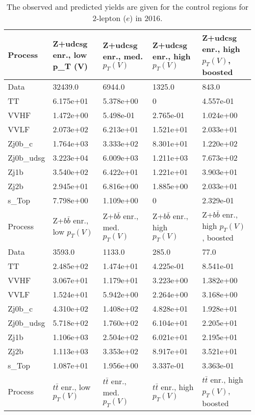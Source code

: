 \begin{table}
\centering
\caption[2016 2-lepton ($e$) control region yields]{
                  The observed and predicted yields are given for the
                  control regions for 2-lepton ($e$) in 2016.
                  }
{\footnotesize
\begin{tabularx}{\textwidth}{|X|X|X|X|X|}
\hline
Process & Z+udcsg enr., low p_{T} (V) & Z+udcsg enr., med. $p_{T}(V)$ & Z+udcsg enr., high $p_{T}(V)$ & Z+udcsg enr., high $p_{T}(V)$, boosted \\
\hline
Data & 32439.0 & 6944.0 & 1325.0 & 843.0 \\
\hline
TT & 6.175e+01 & 5.378e+00 & 0 & 4.557e-01 \\
VVHF & 1.472e+00 & 5.498e-01 & 2.765e-01 & 1.024e+00 \\
VVLF & 2.073e+02 & 6.213e+01 & 1.521e+01 & 2.033e+01 \\
Zj0b\_c & 1.764e+03 & 3.333e+02 & 8.301e+01 & 1.220e+02 \\
Zj0b\_udsg & 3.223e+04 & 6.009e+03 & 1.211e+03 & 7.673e+02 \\
Zj1b & 3.540e+02 & 6.422e+01 & 1.221e+01 & 3.903e+01 \\
Zj2b & 2.945e+01 & 6.816e+00 & 1.885e+00 & 2.033e+01 \\
s\_Top & 7.798e+00 & 1.109e+00 & 0 & 2.329e-01 \\
\hline
\hline
Process & Z+$b\bar{b}$ enr., low $p_{T}(V)$ & Z+$b\bar{b}$ enr., med. $p_{T}(V)$ & Z+$b\bar{b}$ enr., high $p_{T}(V)$ & Z+$b\bar{b}$ enr., high $p_{T}(V)$, boosted \\
\hline
Data & 3593.0 & 1133.0 & 285.0 & 77.0 \\
\hline
TT & 2.485e+02 & 1.474e+01 & 4.225e-01 & 8.541e-01 \\
VVHF & 3.067e+01 & 1.179e+01 & 3.223e+00 & 1.382e+00 \\
VVLF & 1.524e+01 & 5.942e+00 & 2.264e+00 & 3.168e+00 \\
Zj0b\_c & 4.310e+02 & 1.408e+02 & 4.828e+01 & 1.928e+01 \\
Zj0b\_udsg & 5.718e+02 & 1.760e+02 & 6.104e+01 & 2.205e+01 \\
Zj1b & 1.106e+03 & 2.504e+02 & 6.021e+01 & 2.195e+01 \\
Zj2b & 1.113e+03 & 3.353e+02 & 8.917e+01 & 3.521e+01 \\
s\_Top & 1.087e+01 & 1.956e+00 & 3.337e-01 & 3.363e-01 \\
\hline
\hline
Process & $t\bar{t}$ enr., low $p_{T}(V)$ & $t\bar{t}$ enr., med. $p_{T}(V)$ & $t\bar{t}$ enr., high $p_{T}(V)$ & $t\bar{t}$ enr., high $p_{T}(V)$, boosted \\

\end{tabularx}}
\end{table}
